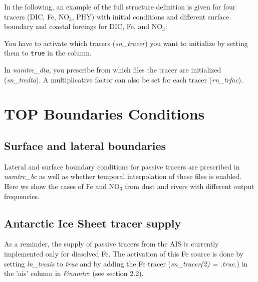 \documentclass[../main/TOP_manual]{subfiles}
\begin{document}
In the following, an example of the full structure definition is given for four tracers (DIC, Fe, NO$_{3}$, PHY) with initial conditions and different surface boundary and coastal forcings for DIC, Fe, and NO$_{3}$: 


You have to activate which tracers (\textit{sn\_tracer}) you want to initialize by setting them to \texttt{true} in the  column. 


In \textit{namtrc\_dta}, you prescribe from which files the tracer are initialized (\textit{sn\_trcdta}). 
A multiplicative factor can also be set for each tracer (\textit{rn\_trfac}). 


\section{ TOP Boundaries Conditions}

\subsection{Surface and lateral boundaries}

Lateral and surface boundary conditions for passive tracers are prescribed in \textit{namtrc\_bc} as well as whether temporal interpolation of these files is enabled. Here we show the cases of Fe and NO$_{3}$ from dust and rivers with different output frequencies.
 

\subsection{Antarctic Ice Sheet tracer supply}

As a reminder, the supply of passive tracers from the AIS is currently implemented only for dissolved Fe. The activation of this Fe source is done by setting \textit{ln\_trcais} to \textit{true} and by adding the Fe tracer (\textit{sn\_tracer(2) = .true.}) in the 'ais' column in \textit{\&namtrc} (see section 2.2). \\
\end{document}
